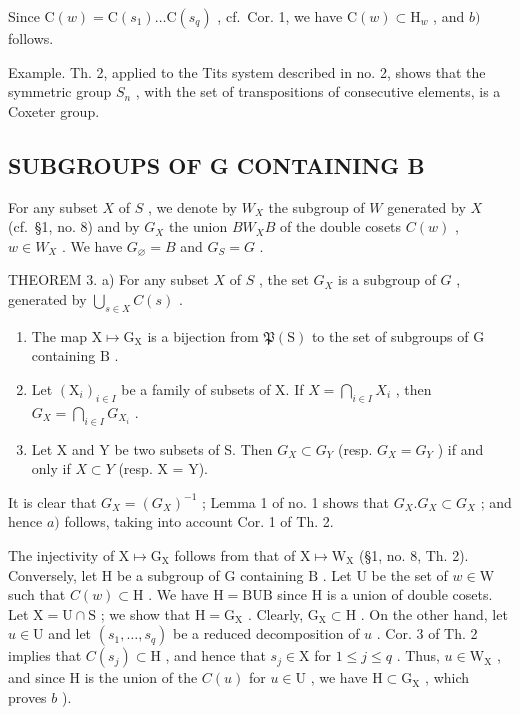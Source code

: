 Since \(\mathrm{C}(w) = \mathrm{C}(s_1) \ldots \mathrm{C}(s_q)\) , cf.~Cor. 1, we have \(\mathrm{C}(w) \subset \mathrm{H}_w\) , and \(b)\) follows.

Example. Th. 2, applied to the Tits system described in no. 2, shows that the symmetric group \(S_{n}\) , with the set of transpositions of consecutive elements, is a Coxeter group.

\subsection{SUBGROUPS OF G CONTAINING B}

For any subset \(X\) of \(S\) , we denote by \(W_X\) the subgroup of \(W\) generated by \(X\) (cf.~§1, no. 8) and by \(G_X\) the union \(BW_X B\) of the double cosets \(C(w)\) , \(w \in W_X\) . We have \(G_\varnothing = B\) and \(G_S = G\) .

THEOREM 3. a) For any subset \(X\) of \(S\) , the set \(G_X\) is a subgroup of \(G\) , generated by \(\bigcup_{s \in X} C(s)\) .

\begin{enumerate}
\def\labelenumi{\alph{enumi})}
\setcounter{enumi}{1}
\item
  The map \(\mathrm{X} \mapsto \mathrm{G}_{\mathrm{X}}\) is a bijection from \(\mathfrak{P}(\mathrm{S})\) to the set of subgroups of \(\mathrm{G}\) containing \(\mathrm{B}\) .
\item
  Let \((\mathrm{X}_i)_{i\in I}\) be a family of subsets of X. If \(X = \bigcap_{i\in I}X_i\) , then \(G_X = \bigcap_{i\in I}G_{X_i}\) .
\item
  Let X and Y be two subsets of S. Then \(G_{X} \subset G_{Y}\) (resp. \(G_{X} = G_{Y}\) ) if and only if \(X \subset Y\) (resp. X = Y).
\end{enumerate}

It is clear that \(G_{X} = (G_{X})^{-1}\) ; Lemma 1 of no. 1 shows that \(G_{X}.G_{X} \subset G_{X}\) ; and hence \(a)\) follows, taking into account Cor. 1 of Th. 2.

The injectivity of \(\mathrm{X} \mapsto \mathrm{G}_{\mathrm{X}}\) follows from that of \(\mathrm{X} \mapsto \mathrm{W}_{\mathrm{X}}\) (§1, no. 8, Th. 2). Conversely, let \(\mathrm{H}\) be a subgroup of \(\mathrm{G}\) containing \(\mathrm{B}\) . Let \(\mathrm{U}\) be the set of \(w \in \mathrm{W}\) such that \(C(w) \subset \mathrm{H}\) . We have \(\mathrm{H} = \mathrm{BUB}\) since \(\mathrm{H}\) is a union of double cosets. Let \(\mathrm{X} = \mathrm{U} \cap \mathrm{S}\) ; we show that \(\mathrm{H} = \mathrm{G}_{\mathrm{X}}\) . Clearly, \(\mathrm{G}_{\mathrm{X}} \subset \mathrm{H}\) . On the other hand, let \(u \in \mathrm{U}\) and let \((s_1, \ldots, s_q)\) be a reduced decomposition of \(u\) . Cor. 3 of Th. 2 implies that \(C(s_j) \subset \mathrm{H}\) , and hence that \(s_j \in \mathrm{X}\) for \(1 \leqslant j \leqslant q\) . Thus, \(u \in \mathrm{W}_{\mathrm{X}}\) , and since \(\mathrm{H}\) is the union of the \(C(u)\) for \(u \in \mathrm{U}\) , we have \(\mathrm{H} \subset \mathrm{G}_{\mathrm{X}}\) , which proves \(b\) ).

